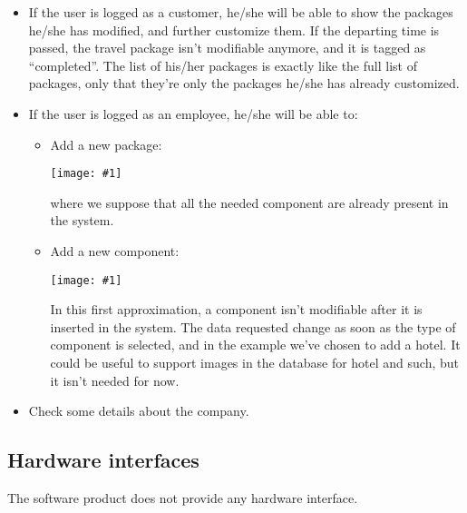 \documentclass[a4paper,12pt]{book}
\newcommand{\putimg}[2]{
  \begin{center}
    \texttt{[image: \#1]}
  \end{center}
}
\begin{document}
\begin{itemize}
  \item If the user is logged as a customer, he/she will be able to show the packages he/she has modified, and further customize them. If the departing time is passed, the travel package isn't modifiable anymore, and it is tagged as ``completed''. The list of his/her packages is exactly like the full list of packages, only that they're only the packages he/she has already customized.
  \item If the user is logged as an employee, he/she will be able to:
  \begin{itemize}
    \item Add a new package:
    \putimg{addpackage}{0.4}
    where we suppose that all the needed component are already present in the system.
    \item Add a new component:
    \putimg{addcomponent}{0.4}
    In this first approximation, a component isn't modifiable after it is inserted in the system. The data requested change as soon as the type of component is selected, and in the example we've chosen to add a hotel. It could be useful to support images in the database for hotel and such, but it isn't needed for now.
  \end{itemize}
  \item Check some details about the company.
\end{itemize}

\subsection{Hardware interfaces}
The software product does not provide any hardware interface.
\end{document}
